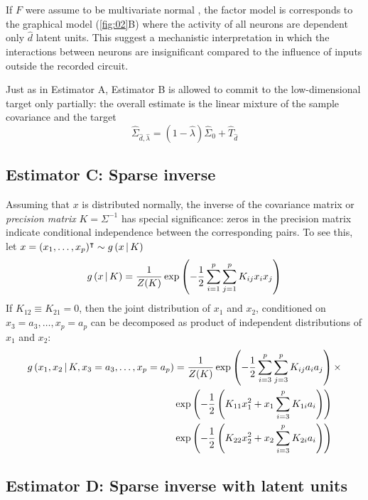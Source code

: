 If $F$ were assume to be multivariate normal , the factor model is corresponds to the graphical model (\autoref{fig:02}B) where the activity of all neurons are dependent only $\hat d$ latent units. This suggest a mechanistic interpretation in which the interactions between neurons are insignificant compared to the influence of inputs outside the recorded circuit.

Just as in Estimator A, Estimator B is allowed to commit to the low-dimensional target only partially: the overall estimate is the linear mixture of the sample covariance and the target
\begin{equation}
\hat\Sigma_{\hat d,\hat\lambda} = (1-\hat\lambda)\hat\Sigma_0 + \hat  T_{\hat d}
\end{equation}


\subsection{Estimator C: Sparse inverse}
Assuming that $x$ is distributed normally, the inverse of the covariance matrix or \emph{precision matrix} $K=\Sigma^{-1}$ has special significance: zeros in the precision matrix indicate conditional independence between the corresponding pairs. To see this, let $x=(x_1,\ldots,x_p)^\intercal \sim g\left(x\,\vert\, K\right)$
\begin{equation}
g\left(x\,\vert\, K\right) = \frac 1 {Z(K)} \exp\left(-\frac 1 2 \sum\limits_{i=1}^p\sum\limits_{j=1}^p  K_{ij} x_i x_j\right)
\end{equation} 
If $K_{12}\equiv K_{21} = 0$, then the joint distribution of $x_1$ and $x_2$, conditioned on $x_3=a_3,\ldots,x_p=a_p$ can be decomposed as product of independent distributions of $x_1$ and $x_2$: 
\begin{equation}
\begin{split}
g\left( x_1, x_2 \,\vert\, K, x_3=a_3,\ldots,x_p=a_p\right) &=
\frac 1 {Z(K)} \exp\left(-\frac 1 2 \sum\limits_{i=3}^p\sum\limits_{j=3}^p  K_{ij} a_i a_j \right)\times
\\
 &  \exp\left( -\frac 1 2\left( K_{11} x_1^2 +  x_1\sum\limits_{i=3}^p K_{1i}a_i \right)  \right)
\\
 &  \exp\left( -\frac 1 2\left( K_{22} x_2^2 +  x_2\sum\limits_{i=3}^p K_{2i}a_i \right)  \right)
\end{split}
\end{equation}


\citep{Dempster:1972,Meinshausen:2006,Friedman:2008}

\subsection{Estimator D: Sparse inverse with latent units}
\citep{Ma:2013} 

